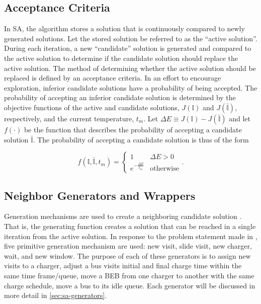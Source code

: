 \documentclass[ee,thesis]{usuthesis}
\newcommand{\I}{\mathbb{I}}                 %
\begin{document}
\subsection{Acceptance Criteria}
\label{sec:acceptance}
In SA, the algorithm stores a solution that is continuously compared to newly generated solutions. Let the stored
solution be referred to as the ``active solution''. During each iteration, a new ``candidate'' solution is generated and
compared to the active solution to determine if the candidate solution should replace the active solution. The method of
determining whether the active solution should be replaced is defined by an acceptance criteria. In an effort to
encourage exploration, inferior candidate solutions have a probability of being accepted. The probability of accepting
an inferior candidate solution is determined by the objective functions of the active and candidate solutions, \(J(\I)\)
and \(J(\bar{\I})\), respectively, and the current temperature, \(t_m\). Let \(\Delta E \equiv J(\I) - J(\bar{\I})\) and let \(f(\cdot)\) be
the function that describes the probability of accepting a candidate solution \(\bar{\I}\). The probability of accepting a
candidate solution is thus of the form \cite{keller-2019-multi-objec}

\begin{equation}
\label{eq:candaccept}
f(\I,\bar{\I},t_m) =
\begin{cases}
  1                   & \Delta E > 0 \\
  e^{- \frac{\Delta E}{t_m}} & \text{otherwise}
\end{cases}\text{.}
\end{equation}

\subsection{Neighbor Generators and Wrappers}
\label{sec:generation-mechanisms}
Generation mechanisms are used to create a neighboring candidate solution \cite{gendreau-2018-handb-metah}. That is,
the generating function creates a solution that can be reached in a single iteration from the active solution. In
response to the problem statement made in , five primitive generation mechanism are used: new
visit, slide visit, new charger, wait, and new window. The purpose of each of these generators is to assign new visits
to a charger, adjust a bus visits initial and final charge time within the same time frame/queue, move a BEB from one
charger to another with the same charge schedule, move a bus to its idle queue. Each generator will be discussed in more
detail in \ref{sec:sa-generators}.
\end{document}
